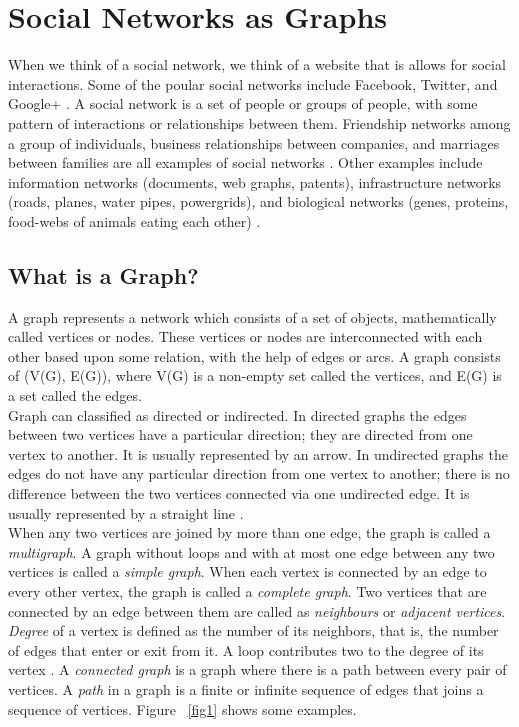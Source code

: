 \documentclass[12pt]{article}
\theoremstyle{definition}
\begin{document}
\section{Social Networks as Graphs} \label{socNws}

When we think of a social network, we think of a website that is allows for social interactions. Some of the poular social networks include Facebook, Twitter, and Google+ \cite{leskovec_rajaraman_ullman_2014}. A social network is a set of people or groups of people, with some pattern of interactions or relationships between them. Friendship networks among a group of individuals, business relationships between companies, and marriages between families are all examples of social networks \cite{Carlson20}. Other examples include information networks (documents, web graphs, patents), infrastructure networks (roads, planes, water pipes, powergrids), and biological networks (genes, proteins, food-webs of animals eating each other) \cite{leskovec_rajaraman_ullman_2014}.

\subsection{What is a Graph?}
A graph represents a network which consists of a set of objects, mathematically called vertices or nodes. These vertices or nodes are interconnected with each other based upon some relation, with the help of edges or arcs. A graph consists of (V(G), E(G)), where V(G) is a non-empty set called the vertices, and E(G) is a set called the edges.\\

Graph can classified as directed or indirected. In directed graphs the edges between two vertices have a particular direction; they are directed from one vertex to another. It is usually represented by an arrow. In undirected graphs the edges do not have any particular direction from one vertex to another; there is no difference between the two vertices connected via one undirected edge. It is usually represented by a straight line \cite{chakraborty2018application}.\\

When any two vertices are joined by more than one edge, the graph is called a \textit{multigraph}. A graph without loops and with at most one edge between any two vertices is called a \textit{simple graph}. When each vertex is connected by an edge to every other vertex, the graph is called a \textit{complete graph}. Two vertices that are connected by an edge between them are called as \textit{neighbours} or \textit{adjacent vertices}. \textit{Degree} of a vertex is defined as the number of its neighbors, that is, the number of edges that enter or exit from it. A loop contributes two to the degree of its vertex \cite{Carlson20}. A \textit{connected graph} is a graph where there is a path between every pair of vertices. A \textit{path} in a graph is a finite or infinite sequence of edges that joins a sequence of vertices. Figure ~\ref{fig1} shows some examples. 
\end{document}

